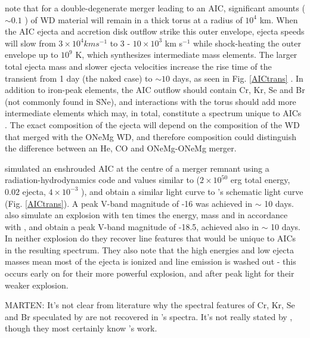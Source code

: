 \citeauthor{metz+09} note that for a double-degenerate merger leading to an AIC, significant amounts ($\sim 0.1$ {\Msun}) of WD material will remain in a thick torus at a radius of $10^4$ km.  When the AIC ejecta and accretion disk outflow strike this outer envelope, ejecta speeds will slow from $3 \times 10^4 km s^{-1}$ to $3$ - $10 \times 10^3$ km s$^{-1}$ while shock-heating the outer envelope up to $10^9$ K, which synthesizes intermediate mass elements.  The larger total ejecta mass and slower ejecta velocities increase the rise time of the transient from 1 day (the naked case) to $\sim 10$ days, as seen in Fig. \ref{AICtrans} \citep{metz+09}.  In addition to iron-peak elements, the AIC outflow should contain Cr, Kr, Se and Br (not commonly found in SNe), and interactions with the torus should add more intermediate elements which may, in total, constitute a spectrum unique to AICs \citep{metz+09}.  The exact composition of the ejecta will depend on the composition of the WD that merged with the ONeMg WD, and therefore composition could distinguish the difference between an He, CO and ONeMg-ONeMg merger.

\cite{frye+09} simulated an enshrouded AIC at the centre of a merger remnant using a radiation-hydrodynamics code and values similar to \citeauthor{dess+06} ($2 \times 10^{50}$ erg total energy, $0.02$ {\Msun} ejecta, $4 \times 10^{-3}$ {\Msun} {\Ni}), and obtain a similar light curve to \citeauthor{metz+09}'s schematic light curve (Fig. \ref{AICtrans}).  A peak V-band magnitude of -16 was achieved in $\sim$ 10 days.  \cite{frye+09} also simulate an explosion with ten times the energy, mass and {\Ni} in accordance with \cite{frye+99}, and obtain a peak V-band magnitude of -18.5, achieved also in $\sim$ 10 days.  In neither explosion do they recover line features that would be unique to AICs in the resulting spectrum.  They also note that the high energies and low ejecta masses mean most of the ejecta is ionized and line emission is washed out - this occurs early on for their more powerful explosion, and after peak light for their weaker explosion.

MARTEN: It's not clear from literature why the spectral features of Cr, Kr, Se and Br speculated by \citeauthor{metz+09} are not recovered in \cite{frye+09}'s spectra.  It's not really stated by \cite{frye+09}, though they most certainly know \citeauthor{metz+09}'s work.

